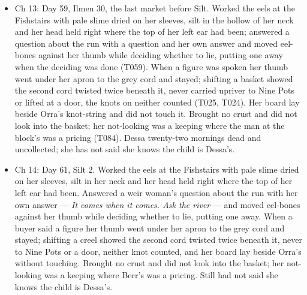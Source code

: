 \documentclass{design/chronicle}
\begin{document}
{\begin{itemize}[leftmargin=1.4em,itemsep=1pt,topsep=3pt,parsep=0pt]
\item Ch 13: Day 59, Ilmen 30, the last market before Silt. Worked the eels at the Fishstairs with pale slime dried on her sleeves, silt in the hollow of her neck and her head held right where the top of her left ear had been; answered a question about the run with a question and her own answer and moved eel-bones against her thumb while deciding whether to lie, putting one away when the deciding was done (T059). When a figure was spoken her thumb went under her apron to the grey cord and stayed; shifting a basket showed the second cord twisted twice beneath it, never carried upriver to Nine Pots or lifted at a door, the knots on neither counted (T025, T024). Her board lay beside Orra’s knot-string and did not touch it. Brought no crust and did not look into the basket; her not-looking was a keeping where the man at the block’s was a pricing (T084). Dessa twenty-two mornings dead and uncollected; she has not said she knows the child is Dessa’s.

\end{itemize}

\begin{itemize}[leftmargin=1.4em,itemsep=1pt,topsep=3pt,parsep=0pt]

\item Ch 14: Day 61, Silt 2. Worked the eels at the Fishstairs with pale slime dried on her sleeves, silt in her neck and her head held right where the top of her left ear had been. Answered a weir woman’s question about the run with her own answer — \emph{It comes when it comes. Ask the river} — and moved eel-bones against her thumb while deciding whether to lie, putting one away. When a buyer said a figure her thumb went under her apron to the grey cord and stayed; shifting a creel showed the second cord twisted twice beneath it, never to Nine Pots or a door, neither knot counted, and her board lay beside Orra’s without touching. Brought no crust and did not look into the basket; her not-looking was a keeping where Berr’s was a pricing. Still had not said she knows the child is Dessa’s.

\end{itemize}

\begin{itemize}[leftmargin=1.4em,itemsep=1pt,topsep=3pt,parsep=0pt]


\end{itemize}}
\end{document}
